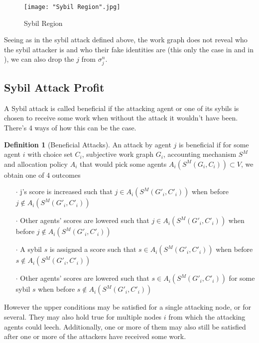 \documentclass[11pt,a4paper]{article}
\theoremstyle{definition}
\newtheorem{definition}{Definition}[section]
\theoremstyle{theorem}
\theoremstyle{proposition}
\theoremstyle{corollary}
\theoremstyle{lemma}
\theoremstyle{example}
\theoremstyle{remark}
\begin{document}
\begin{figure}[H]
\begin{center}
\texttt{[image: "Sybil Region".jpg]}
\caption{Sybil Region}
\label{fig:Sybil Region}
\end{center}
\end{figure}

\noindent{}Seeing as in the sybil attack defined above, the work graph does not reveal who the sybil attacker is and who their fake identities are (this only the case in \cite{Sybil-resistant Trust Mechanisms in Distributed Systems} and in \cite{On the Sybil-Proofness of Accounting Mechanisms}), we can also drop the $j$ from $\sigma^n_j$. \vspace{1em}\\

\subsection{Sybil Attack Profit}
\label{subsec:Sybil Attack Profit}
\noindent A Sybil attack is called beneficial if the attacking agent or one of its sybils is chosen to receive some work when without the attack it wouldn't have been. There's 4 ways of how this can be the case. 

\begin{definition}[Beneficial Attacks]
An attack by agent $j$ is beneficial if for some agent $i$ with choice set $C_i$, subjective work graph $G_i$, accounting mechanism $S^M$ and allocation policy $A_i$ that would pick some agents $A_i(S^M(G_i,C_i))\subset{}V$, we obtain one of 4 outcomes 
\begin{itemize}
\item[$\cdot$] j's score is increased such that $j\in{}A_i(S^M(G'_i,C'_i))$ when before $j\not\in{}A_i(S^M(G'_i,C'_i))$
\item[$\cdot$] Other agents' scores are lowered such that $j\in{}A_i(S^M(G'_i,C'_i))$ when before $j\not\in{}A_i(S^M(G'_i,C'_i))$
\item[$\cdot$] A sybil $s$ is assigned a score such that $s\in{}A_i(S^M(G'_i,C'_i))$ when before $s\not\in{}A_i(S^M(G'_i,C'_i))$
\item[$\cdot$] Other agents' scores are lowered such that $s\in{}A_i(S^M(G'_i,C'_i))$ for some sybil $s$ when before $s\not\in{}A_i(S^M(G'_i,C'_i))$
\end{itemize}
\end{definition}
\noindent{}However the upper conditions may be satisfied for a single attacking node, or for several. They may also hold true for multiple nodes $i$ from which the attacking agents could leech. Additionally, one or more of them may also still be satisfied after one or more of the attackers have received some work. \vspace{1em}\\
\end{document}
